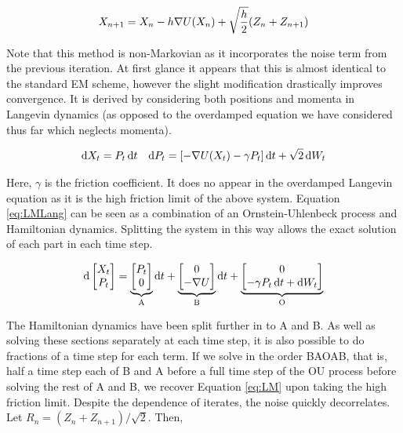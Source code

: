 \begin{equation} X_{n+1} = X_n - h \nabla U (X_n) +\sqrt{\frac{h}{2}} (Z_n+Z_{n+1}) \label{eq:LM} \end{equation}

Note that this method is non-Markovian as it incorporates the noise term from the previous iteration. At first glance it appears that this is almost identical to the standard EM scheme, however the slight modification drastically improves convergence.  It is derived by considering both positions and momenta in Langevin dynamics (as opposed to the overdamped equation we have considered thus far which neglects momenta).

\begin{align} \mathop{}\!\mathrm{d} X_t = P_t \mathop{}\!\mathrm{d} t && \mathop{}\!\mathrm{d} P_t = \lbrack -\nabla U(X_t) - \gamma P_t \rbrack \mathop{}\!\mathrm{d} t + \sqrt{2} \mathop{}\!\mathrm{d} W_t \label{eq:LMLang} \end{align}

Here, \(\gamma\) is the friction coefficient. It does no appear in the overdamped Langevin equation as it is the high friction limit of the above system.  Equation \eqref{eq:LMLang} can be seen as a combination of an Ornstein-Uhlenbeck process and Hamiltonian dynamics. Splitting the system in this way allows the exact solution of each part in each time step.

\[ \mathop{}\!\mathrm{d} \begin{bmatrix} X_t\\P_t \end{bmatrix} = \underbrace{\begin{bmatrix} P_t \\ 0 \end{bmatrix}}_{\text{A}} \mathop{}\!\mathrm{d} t + \underbrace{\begin{bmatrix}  0\\-\nabla U \end{bmatrix}}_{\text{B}} \mathop{}\!\mathrm{d} t + \underbrace{\begin{bmatrix} 0\\ -\gamma P_t \mathop{}\!\mathrm{d} t + \mathop{}\!\mathrm{d} W_t \end{bmatrix}}_{\text{O}} \]

The Hamiltonian dynamics have been split further in to A and B.  As well as solving these sections separately at each time step, it is also possible to do fractions of a time step for each term. If we solve in the order BAOAB, that is, half a time step each of B and A before a full time step of the OU process before solving the rest of A and B, we recover Equation \eqref{eq:LM} upon taking the high friction limit. Despite the dependence of iterates, the noise quickly decorrelates. Let \(R_n = (Z_n+Z_{n+1})/\sqrt{2}\). Then,

